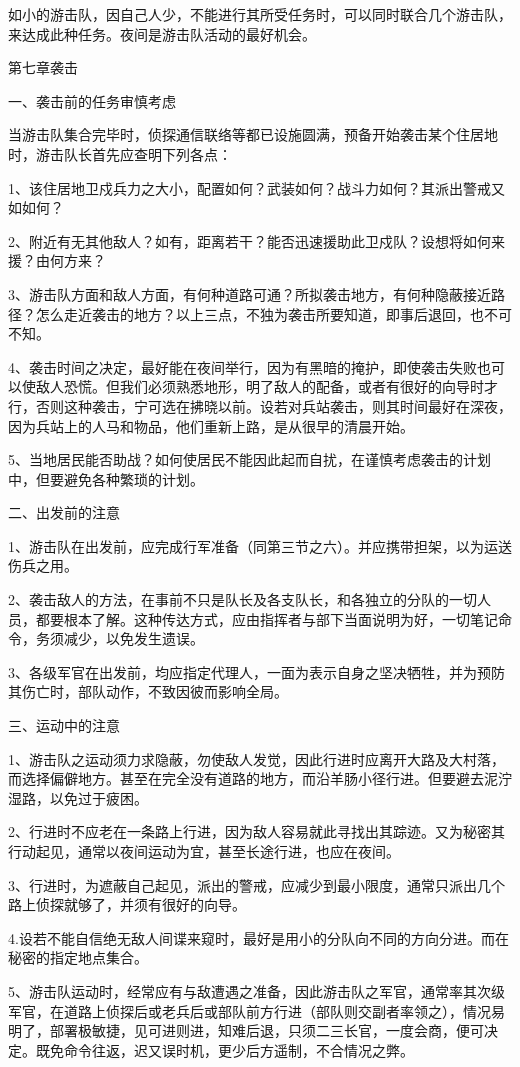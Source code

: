 如小的游击队，因自己人少，不能进行其所受任务时，可以同时联合几个游击队，来达成此种任务。夜间是游击队活动的最好机会。

第七章袭击

一、袭击前的任务审慎考虑

当游击队集合完毕时，侦探通信联络等都已设施圆满，预备开始袭击某个住居地时，游击队长首先应查明下列各点：

1、该住居地卫戍兵力之大小，配置如何？武装如何？战斗力如何？其派出警戒又如如何？

2、附近有无其他敌人？如有，距离若干？能否迅速援助此卫戍队？设想将如何来援？由何方来？

3、游击队方面和敌人方面，有何种道路可通？所拟袭击地方，有何种隐蔽接近路径？怎么走近袭击的地方？以上三点，不独为袭击所要知道，即事后退回，也不可不知。

4、袭击时间之决定，最好能在夜间举行，因为有黑暗的掩护，即使袭击失败也可以使敌人恐慌。但我们必须熟悉地形，明了敌人的配备，或者有很好的向导时才行，否则这种袭击，宁可选在拂晓以前。设若对兵站袭击，则其时间最好在深夜，因为兵站上的人马和物品，他们重新上路，是从很早的清晨开始。

5、当地居民能否助战？如何使居民不能因此起而自扰，在谨慎考虑袭击的计划中，但要避免各种繁琐的计划。

二、出发前的注意

1、游击队在出发前，应完成行军准备（同第三节之六）。并应携带担架，以为运送伤兵之用。

2、袭击敌人的方法，在事前不只是队长及各支队长，和各独立的分队的一切人员，都要根本了解。这种传达方式，应由指挥者与部下当面说明为好，一切笔记命令，务须减少，以免发生遗误。

3、各级军官在出发前，均应指定代理人，一面为表示自身之坚决牺牲，并为预防其伤亡时，部队动作，不致因彼而影响全局。

三、运动中的注意

1、游击队之运动须力求隐蔽，勿使敌人发觉，因此行进时应离开大路及大村落，而选择偏僻地方。甚至在完全没有道路的地方，而沿羊肠小径行进。但要避去泥泞湿路，以免过于疲困。

2、行进时不应老在一条路上行进，因为敌人容易就此寻找出其踪迹。又为秘密其行动起见，通常以夜间运动为宜，甚至长途行进，也应在夜间。

3、行进时，为遮蔽自己起见，派出的警戒，应减少到最小限度，通常只派出几个路上侦探就够了，并须有很好的向导。

4.设若不能自信绝无敌人间谍来窥时，最好是用小的分队向不同的方向分进。而在秘密的指定地点集合。

5、游击队运动时，经常应有与敌遭遇之准备，因此游击队之军官，通常率其次级军官，在道路上侦探后或老兵后或部队前方行进（部队则交副者率领之），情况易明了，部署极敏捷，见可进则进，知难后退，只须二三长官，一度会商，便可决定。既免命令往返，迟又误时机，更少后方遥制，不合情况之弊。

